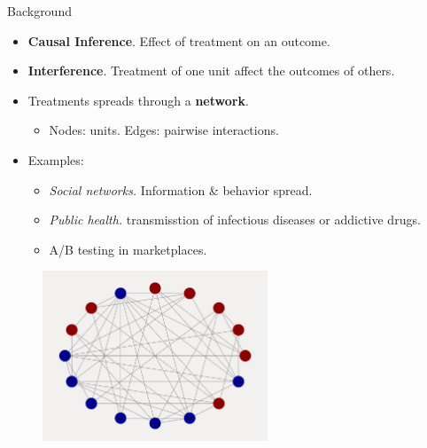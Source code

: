 \documentclass{beamer}
\begin{document}
    \begin{frame}{Background}
        \large
        \begin{itemize}
            \item<1-> \textbf{Causal Inference}. Effect of treatment on an outcome. 
            \vspace{0.2cm}
            \item<2-> \textbf{Interference}. Treatment of one unit affect the outcomes of others.
            \vspace{0.2cm}
            \item<3->  Treatments spreads through a \textbf{network}.
            \begin{itemize}
                \item Nodes: units. Edges: pairwise interactions.
            \vspace{0.2cm}
            \end{itemize}
            \item<4-> Examples:
                \begin{itemize}
                    \item \emph{Social networks.} Information \& behavior spread.
                    \vspace{0.05cm}
                    \item \emph{Public health.} transmisstion of infectious diseases or addictive drugs.
                    \vspace{0.05cm}
                    \item A/B testing in marketplaces.
                \end{itemize} 
        \end{itemize}
    \end{frame}

    \begin{frame}[t]
        \begin{figure}[t]
            \centering
            \includegraphics[width=0.6\textwidth]{figs/connected_net.png}
        \end{figure}
    \end{frame}
\end{document}
